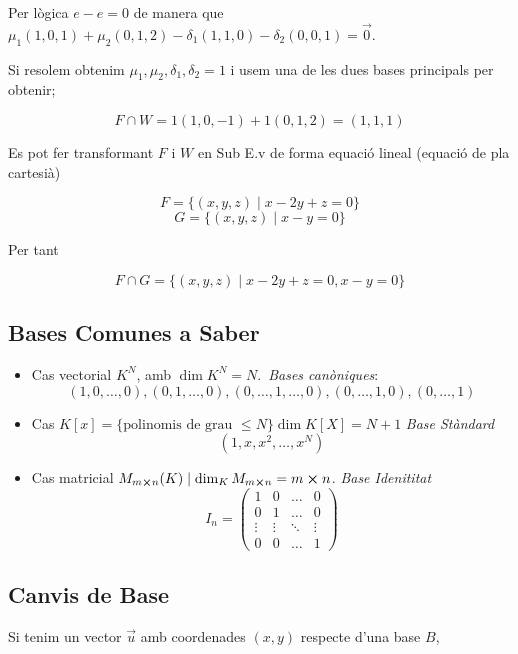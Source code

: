 \documentclass[12pt]{article}
\begin{document}
\begin{examplebox}{}
    Per lògica $e-e = 0$ de manera que $\mu_1 (1,0,1) + \mu_2(0,1,2) -\delta_1 (1,1,0) - \delta_2(0,0,1) = \vec{0}$.

    Si resolem obtenim $\mu_1, \mu_2, \delta_1, \delta_2 = 1$ i usem una de les dues bases principals per obtenir;

    \[F \cap W = 1(1,0,-1) + 1(0,1,2) = (1,1,1)\]

    Es pot fer transformant $F$ i $W$ en Sub E.v de forma equació lineal (equació de pla cartesià)

    \[F = \{(x,y,z) \mid x-2y + z = 0\}\]
    \[G = \{(x,y,z) \mid x-y = 0\}\]

    Per tant

    \[F\cap G = \{(x,y,z) \mid x-2y+z = 0, x-y = 0\}\]

\end{examplebox}

\subsection{Bases Comunes a Saber}

\begin{itemize}
    \item Cas vectorial $K^N$, amb $\dim K^N = N$.\
        \textit{Bases canòniques}: 
        \[
        (1,0,\dots,0), (0,1,\dots,0), (0,\dots,1,\dots,0), (0,\dots,1,0), (0,\dots,1)
        \]
    \item Cas $K[x] = \{\text{polinomis de grau }\leq N\} \dim K[X] = N + 1$
        \textit{Base Stàndard}
        \[
        (1, x, x^2, \dots, x^N)
        \]
    \item Cas matricial $M_{m\cross n}(K) \mid \dim_K M_{m\cross n} = m \cross n$. 
        \textit{Base Idenititat}
        \[
        I_n =
        \begin{pmatrix}
        1 & 0 & \dots & 0 \\
        0 & 1 & \dots & 0 \\
        \vdots & \vdots & \ddots & \vdots \\
        0 & 0 & \dots & 1
        \end{pmatrix}
        \]
\end{itemize}

\subsection{Canvis de Base}

Si tenim un vector \(\vec{u}\) amb coordenades \((x,y)\) respecte d'una base \(B\),
\end{document}
